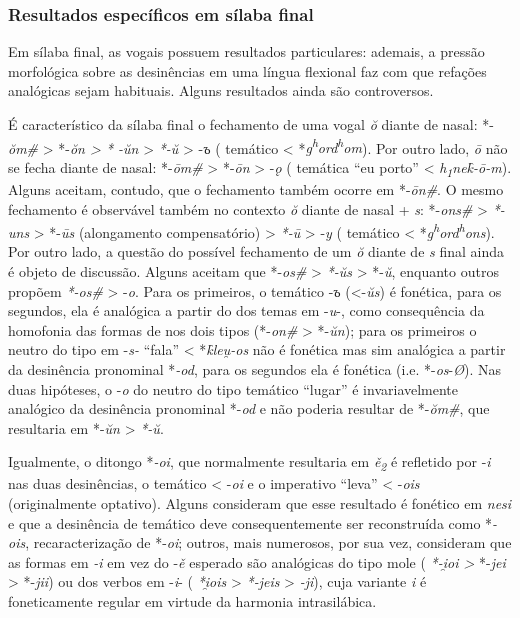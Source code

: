 \subsubsection{Resultados específicos em sílaba final}
Em sílaba final, as vogais possuem resultados particulares: ademais, a
pressão morfológica sobre as desinências em uma língua flexional faz com
que refações analógicas sejam habituais. Alguns resultados ainda são
controversos.

É característico da sílaba final o fechamento de uma vogal \emph{ŏ}
diante de nasal: *-\emph{ŏm\#} > *-\emph{ŏn >
	* -ŭn} > \emph{*-ŭ} > -\emph{ъ} ( temático  <
*\emph{g\textsuperscript{h}ord\textsuperscript{h}om}). Por outro lado,
\emph{ō} não se fecha diante de nasal: *-\emph{ōm\#} >
*-\emph{ōn} > -\emph{ǫ} ( temática 
``eu porto'' < \emph{h\textsubscript{1}nek̑-ō-m}). Alguns
aceitam, contudo, que o fechamento também ocorre em *-\emph{ōn\#}. O
mesmo fechamento é observável também no contexto \emph{ŏ} diante de
nasal + \emph{s}: *-\emph{ons\#} > \emph{*-uns}
> *-\emph{ūs} (alongamento compensatório) >
\emph{*-ū} > -\emph{y} ( temático  <
*\emph{g\textsuperscript{h}ord\textsuperscript{h}ons}). Por outro lado,
a questão do possível fechamento de um \emph{ŏ} diante de \emph{s} final
ainda é objeto de discussão. Alguns aceitam que *-\emph{os\#}
> \emph{*-ŭs} > *-\emph{ŭ}, enquanto outros
propõem \emph{*-os\#} > -\emph{o}. Para os primeiros, o
 temático -\emph{ъ} (<-\emph{ŭs}) é fonética, para os
segundos, ela é analógica a partir do  dos temas em -\emph{u}-,
como consequência da homofonia das formas de  nos dois tipos
(*-\emph{on\#} > *-\emph{ŭn}); para os primeiros o
 neutro do tipo em -\emph{s-}  ``fala''
< *\emph{k̑leu̯-os} não é fonética mas sim analógica a partir da
desinência pronominal *\emph{-od}, para os segundos ela é fonética (i.e.
*-\emph{os}-\emph{Ø}). Nas duas hipóteses, o -\emph{o} do 
neutro do tipo temático  ``lugar'' é invariavelmente
analógico da desinência pronominal *-\emph{od} e não poderia resultar de
*-\emph{ŏm\#}, que resultaria em *-\emph{ŭn} > \emph{*-ŭ}.

Igualmente, o ditongo *\emph{-oi}, que normalmente resultaria em
\emph{ě\textsubscript{2}} é refletido por -\emph{i} nas duas
desinências, o  temático  < -\emph{oi}
e o imperativo   ``leva'' < -\emph{ois}
(originalmente optativo). Alguns consideram que esse resultado é
fonético em \emph{nesi} e que a desinência de  temático deve
consequentemente ser reconstruída como *\emph{-ois}, recaracterização de
*-\emph{oi}; outros, mais numerosos, por sua vez, consideram que as
formas em \emph{-i} em vez do -\emph{ě} esperado são analógicas do tipo
mole ( \emph{*-i̯oi >} *-\emph{jei} >
*-\emph{jii}) ou dos verbos em -\emph{i}- ( \emph{*i̯ois}
> \emph{*-jeis} >  \emph{-ji}), cuja
variante \emph{i} é foneticamente regular em virtude da harmonia
intrasilábica.

